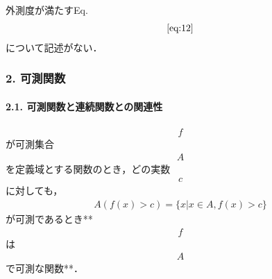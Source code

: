 \documentclass[letterpaper,10pt,english]{sphinxmanual}
\begin{document}
\sphinxAtStartPar
外測度が満たすEq.
\begin{equation*}
\begin{split}\eqref{eq:12}\end{split}
\end{equation*}
\sphinxAtStartPar
について記述がない．


\subsubsection{2. 可測関数}
\label{\detokenize{src/stochasticcalculus/2020-03-16-lebesgue:id8}}

\paragraph{2.1. 可測関数と連続関数との関連性}
\label{\detokenize{src/stochasticcalculus/2020-03-16-lebesgue:id9}}\begin{equation*}
\begin{split}f\end{split}
\end{equation*}
\sphinxAtStartPar
が可測集合
\begin{equation*}
\begin{split}A\end{split}
\end{equation*}
\sphinxAtStartPar
を定義域とする関数のとき，どの実数
\begin{equation*}
\begin{split}c\end{split}
\end{equation*}
\sphinxAtStartPar
に対しても，
\begin{equation*}
\begin{split}\begin{equation}
A(f(x) > c) = \{ x | x \in A, f(x) > c \}
\end{equation}\end{split}
\end{equation*}
\sphinxAtStartPar
が可測であるとき**
\begin{equation*}
\begin{split}f\end{split}
\end{equation*}
\sphinxAtStartPar
は
\begin{equation*}
\begin{split}A\end{split}
\end{equation*}
\sphinxAtStartPar
で可測な関数**．
\end{document}
